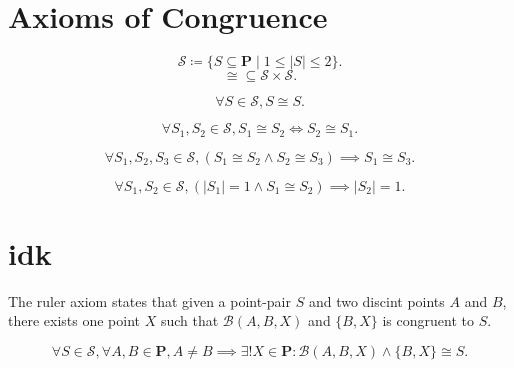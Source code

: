 \documentclass[../../../main/main.tex]{subfiles}
\begin{document}
\section{Axioms of Congruence}
\[ \mathcal{S} \coloneqq \{ S \subseteq \mathbf{P} \mid 1 \le |S| \le 2 \}. \]
\[ \cong \subseteq \mathcal{S} \times \mathcal{S}. \]
\begin{axiom}
    \[
    \forall S \in \mathcal{S}, S \cong S.
    \]
\end{axiom}
\begin{axiom}
    \[
    \forall S_1, S_2 \in \mathcal{S}, S_1 \cong S_2 \iff S_2 \cong S_1.
    \]
\end{axiom}
\begin{axiom}
    \[
    \forall S_1, S_2, S_3 \in \mathcal{S}, (S_1 \cong S_2 \land S_2 \cong S_3) \implies S_1 \cong S_3.
    \]
\end{axiom}
\begin{axiom}
    \[
    \forall S_1, S_2 \in \mathcal{S}, (|S_1| = 1 \land S_1 \cong S_2 ) \implies |S_2| = 1.
    \]
\end{axiom}

\section{idk}
The ruler axiom states that given a point-pair $S$ and two discint points $A$ and $B$, there exists one point $X$ such that $\mathcal{B}(A, B, X)$ and $\{B, X\}$ is congruent to $S$.
\begin{axiom}
    \[
    \forall S \in \mathcal{S}, \forall A, B \in \mathbf{P}, A \neq B \implies \exists!X \in \mathbf{P} \colon \mathcal{B}(A, B, X) \land \{B, X\} \cong S.
    \]
\end{axiom}
\end{document}

